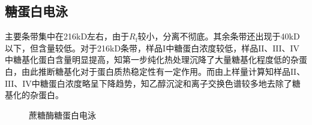\newpage
\subsection{糖蛋白电泳}
\par 主要条带集中在216kD左右，由于$R_\text{f}$较小，分离不彻底。其余条带还出现于40kD以下，但含量较低。对于216kD条带，样品$\mathrm{I}$中糖蛋白浓度较低，样品$\mathrm{II}$、$\mathrm{III}$、$\mathrm{IV}$中糖基化蛋白含量明显提高，知第一步纯化热处理沉降了大量糖基化程度低的杂蛋白，由此推断糖基化对于蛋白质热稳定性有一定作用。而由上样量计算知样品$\mathrm{II}$、$\mathrm{III}$、$\mathrm{IV}$中糖蛋白浓度略呈下降趋势，知乙醇沉淀和离子交换色谱较多地去除了糖基化的杂蛋白。

\begin{figure}[H]
    \caption{蔗糖酶糖蛋白电泳}
    \label{fig:EN}
\end{figure}


